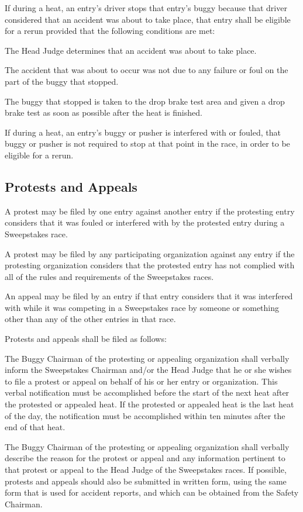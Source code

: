 \documentclass[openany]{book}
\begin{document}
If during a heat, an entry's driver stops that entry's buggy because that driver considered that an accident was about to take place, that entry shall be eligible for a rerun provided that the following conditions are met:

The Head Judge determines that an accident was about to take place.

The accident that was about to occur was not due to any failure or foul on the part of the buggy that stopped.

The buggy that stopped is taken to the drop brake test area and given a drop brake test as soon as possible after the heat is finished.

If during a heat, an entry's buggy or pusher is interfered with or fouled, that buggy or pusher is not required to stop at that point in the race, in order to be eligible for a rerun.

\subsection{Protests and Appeals}

A protest may be filed by one entry against another entry if the protesting entry considers that it was fouled or interfered with by the protested entry during a Sweepstakes race.

A protest may be filed by any participating organization against any entry if the protesting organization considers that the protested entry has not complied with all of the rules and requirements of the Sweepstakes races.

An appeal may be filed by an entry if that entry considers that it was interfered with while it was competing in a Sweepstakes race by someone or something other than any of the other entries in that race.

Protests and appeals shall be filed as follows:

The Buggy Chairman of the protesting or appealing organization shall verbally inform the Sweepstakes Chairman and/or the Head Judge that he or she wishes to file a protest or appeal on behalf of his or her entry or organization. This verbal notification must be accomplished before the start of the next heat after the protested or appealed heat. If the protested or appealed heat is the last heat of the day, the notification must be accomplished within ten minutes after the end of that heat.

The Buggy Chairman of the protesting or appealing organization shall verbally describe the reason for the protest or appeal and any information pertinent to that protest or appeal to the Head Judge of the Sweepstakes races. If possible, protests and appeals should also be submitted in written form, using the same form that is used for accident reports, and which can be obtained from the Safety Chairman.
\end{document}
